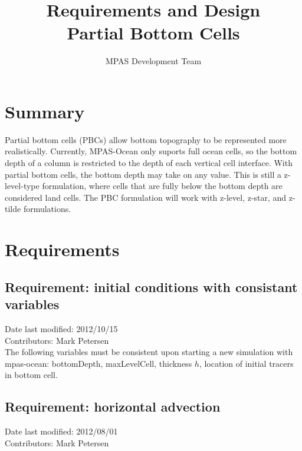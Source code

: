\documentclass[11pt]{report}
\begin{document}
\title{
Requirements and Design\\
Partial Bottom Cells}
\author{MPAS Development Team}

\maketitle
\tableofcontents


\chapter{Summary}

Partial bottom cells (PBCs) allow bottom topography to be represented more realistically.  Currently, MPAS-Ocean only suports full ocean cells, so the bottom depth of a column is restricted to the depth of each vertical cell interface.  With partial bottom cells, the bottom depth may take on any value.  This is still a z-level-type formulation, where cells that are fully below the bottom depth are considered land cells.  The PBC formulation will work with z-level, z-star, and z-tilde formulations.



\chapter{Requirements}

\section{Requirement: initial conditions with consistant variables}
Date last modified: 2012/10/15 \\
Contributors: Mark Petersen \\

The following variables must be consistent upon starting a new simulation with mpas-ocean: bottomDepth, maxLevelCell, thickness $h$, location of initial tracers in bottom cell.

\section{Requirement: horizontal advection}
Date last modified: 2012/08/01 \\
Contributors: Mark Petersen \\
\end{document}
